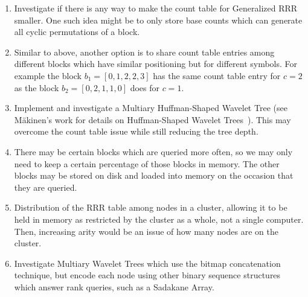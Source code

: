 \begin{enumerate}
\item
	Investigate if there is any way to make the count table for Generalized RRR 
	smaller. One such idea might be to only store base counts which can
	generate all cyclic permutations of a block.
	
\item
	Similar to above, another option is to share count table entries among 
	different blocks which have similar positioning but for different symbols. 
	For example the block $b_1 = [0, 1, 2, 2, 3]$ has the same count table entry 
	for $c = 2$ as the block $b_2 = [0, 2, 1, 1, 0]$ does for $c = 1$.
	
\item
	Implement and investigate a Multiary Huffman-Shaped Wavelet Tree (see 
	M\"{a}kinen's work for details on Huffman-Shaped Wavelet
	Trees~\cite{huffmanWT:makinen2005}). This may
	overcome the count table issue while still reducing the tree depth.

\item
	There may be certain blocks which are queried more often, so we may only
	need to keep a certain percentage of those blocks in memory. The other 
	blocks may be stored on disk and loaded into memory on the occasion that 
	they are queried.

\item
	Distribution of the RRR table among nodes in a cluster, allowing it to be
	held in memory as restricted by the cluster as a whole, not a single
	computer. Then, increasing arity would be an issue of how many nodes are
	on the cluster.

\item
	Investigate Multiary Wavelet Trees which use the bitmap concatenation 
	technique, but encode each node using other binary sequence structures which 
	answer rank queries, such as a Sadakane Array.

\end{enumerate}